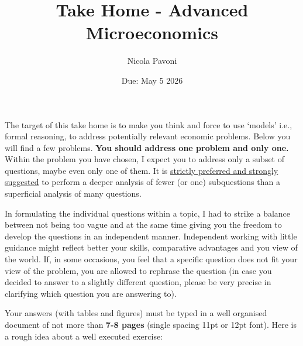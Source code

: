 \documentclass[11pt,a4paper]{article}
\title{Take Home - Advanced Microeconomics}
\author{Nicola Pavoni}
\date{Due: May 5 2026}
\begin{document}
\maketitle


The target of this take home is to make you think and force to use `models' i.e., formal reasoning, to address potentially relevant economic problems. Below you will find a few problems. \textbf{You should address one problem and only one.} Within the problem you have chosen, I expect you to address only a subset of questions, maybe even only one of them. It is \underline{strictly preferred and strongly suggested} to perform a deeper analysis of fewer (or one) subquestions than a superficial analysis of many questions.

In formulating the individual questions within a topic, I had to strike a balance between not being too vague and at the same time giving you the freedom to develop the questions in an independent manner. Independent working with little guidance might reflect better your skills, comparative advantages and you view of the world. If, in some occasions, you feel that a specific question does not fit your view of the problem, you are allowed to rephrase the question (in case you decided to answer to a slightly different question, please be very precise in clarifying which question you are answering to).

Your answers (with tables and figures) must be typed in a well organised document of not more than \textbf{7-8 pages} (single spacing 11pt or 12pt font). Here is a rough idea about a well executed exercise:
\end{document}
